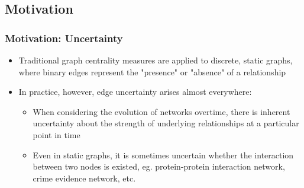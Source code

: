 \documentclass[10pt]{beamer}
\newcommand{\themename}{\textbf{\textsc{metropolis}}\xspace}
\begin{document}



\subsection{Motivation}
\begin{frame}
\frametitle{Motivation: Uncertainty}
\begin{itemize}
\item Traditional graph centrality measures are applied to discrete, static graphs, where binary edges represent the "presence" or "absence" of a relationship
\item In practice, however, edge uncertainty arises almost everywhere:
\vspace{-0.2in}
\begin{itemize}
\item When considering the evolution of networks overtime, there is inherent uncertainty about the strength of underlying relationships at a particular point in time
\item Even in static graphs, it is sometimes uncertain whether the interaction between two nodes is existed, eg. protein-protein interaction network, crime evidence network, etc.
\end{itemize}
\end{itemize}
\end{frame}
\end{document}
